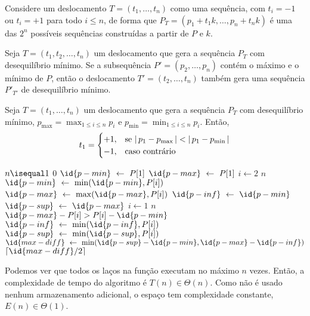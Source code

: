 Considere um deslocamento $T = (t_1, \ldots, t_n)$ como uma sequência, com $t_i = -1$ ou $t_i = +1$ para todo $i \leq n$, de forma que $P_T = (p_1 + t_1 k, \ldots, p_n + t_n k)$ é uma das $2^n$ possíveis sequências construídas a partir de $P$ e $k$.

\begin{theorem}
    Seja $T = (t_1, t_2, \ldots, t_n)$ um deslocamento que gera a sequência $P_T$ com desequilíbrio mínimo. Se a subsequência $P' = (p_2, \ldots, p_n)$ contém o máximo e o mínimo de $P$, então o deslocamento $T' = (t_2, \ldots, t_n)$ também gera uma sequência $P'_{T'}$ de desequilíbrio mínimo.
\end{theorem}

\begin{theorem}
    Seja $T = (t_1, \ldots, t_n)$ um deslocamento que gera a sequência $P_T$ com desequilíbrio mínimo, $p_{\max} = \max_{1 \leq i \leq n} p_i$ e $p_{\min} = \min_{1 \leq i \leq n} p_i$. Então,
    \[
        t_1 = \begin{cases}
            +1, & \text{se } {\lvert\,p_1 - p_{\max}\,\rvert} < {\lvert\,p_1 - p_{\min}\,\rvert} \\
            -1, & \text{caso contrário}
        \end{cases}
    \]
\end{theorem}

\begin{codebox}
    \li {} $n \isequal 1$ 
        \Do
    \li     {} 0
        \End
    \li
    \li $\id{p-min} \gets P[1]$
    \li $\id{p-max} \gets P[1]$
    \li {} $i \gets 2$  $n$
        \Do
    \li     $\id{p-min} \gets \min(\id{p-min}, P[i])$
    \li     $\id{p-max} \gets \max(\id{p-max}, P[i])$
        \End
    \li
    \li $\id{p-inf} \gets \id{p-min}$
    \li $\id{p-sup} \gets \id{p-max}$
    \li {} $i \gets 1$  $n$
        \Do
    \li     {} $\id{p-max} - P[i] > P[i] - \id{p-min}$ 
            \Do
    \li         $\id{p-inf} \gets \min(\id{p-inf}, P[i])$
            \End
    \li     {}
            \Do
    \li         $\id{p-sup} \gets \min(\id{p-sup}, P[i])$
            \End
        \End
    \li
    \li $\id{max-diff} \gets \min(\id{p-sup} - \id{p-min}, \id{p-max} - \id{p-inf})$
    \li {} $\lceil \id{max-diff} / 2 \rceil$
\end{codebox}

Podemos ver que todos os laços na função executam no máximo $n$ vezes. Então, a complexidade de tempo do algoritmo é $T(n) \in \Theta(n)$. Como não é usado nenhum armazenamento adicional, o espaço tem complexidade constante, $E(n) \in \Theta(1)$.
